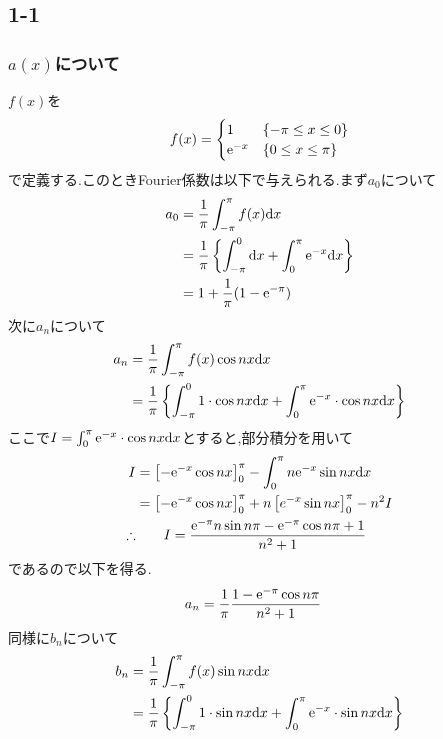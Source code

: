 \subsection*{1-1}
\subsubsection*{$a(x)$について}
$f(x)$を
\begin{align*}
  f(x)=\begin{cases}
    1            & \{-\pi\leq x \leq 0\} \\
    {\rm e}^{-x} & \{0\leq x \leq \pi\}
  \end{cases}
\end{align*}
で定義する.このときFourier係数は以下で与えられる.まず$a_0$について
\begin{align*}
  a_0 & =\frac{1}{\pi}\int^\pi_{-\pi}f(x){\rm d}x                                         \\
      & =\frac{1}{\pi}\left\{\int^0_{-\pi}{\rm d}x+\int^\pi_0{\rm e}^{-x}{\rm d}x\right\} \\
      & =1+\frac{1}{\pi}(1-{\rm e}^{-\pi})
\end{align*}
次に$a_n$について
\begin{align*}
  a_n & =\frac{1}{\pi}\int^\pi_{-\pi}f(x)\cos nx{\rm d}x                                                             \\
      & =\frac{1}{\pi}\left\{\int^0_{-\pi}1\cdot\cos nx{\rm d}x+\int^{\pi}_0{\rm e}^{-x}\cdot\cos nx{\rm d}x\right\}
\end{align*}
ここで$I=\int^\pi_0{\rm e}^{-x}\cdot\cos nx{\rm d}x$とすると,部分積分を用いて
\begin{align*}
  I          & =\left[-{\rm e}^{-x}\cos nx\right]^\pi_0-\int^\pi_0n{\rm e}^{-x}\sin nx {\rm d}x \\
             & =\left[-{\rm e}^{-x}\cos nx\right]^\pi_0+n\left[e^{-x}\sin nx\right]^\pi_0-n^2I  \\
  \therefore & \qquad I=\frac{{\rm e}^{-\pi}n\sin n\pi-{\rm e}^{-\pi}\cos n\pi+1}{n^2+1}
\end{align*}
であるので以下を得る.
\begin{align*}
  a_n & =\frac{1}{\pi}\frac{1-{\rm e}^{-\pi}\cos n\pi}{n^2+1}
\end{align*}
同様に$b_n$について
\begin{align*}
  b_n & =\frac{1}{\pi}\int^\pi_{-\pi}f(x)\sin nx{\rm d}x                                                             \\
      & =\frac{1}{\pi}\left\{\int^0_{-\pi}1\cdot\sin nx{\rm d}x+\int^{\pi}_0{\rm e}^{-x}\cdot\sin nx{\rm d}x\right\}
\end{align*}
